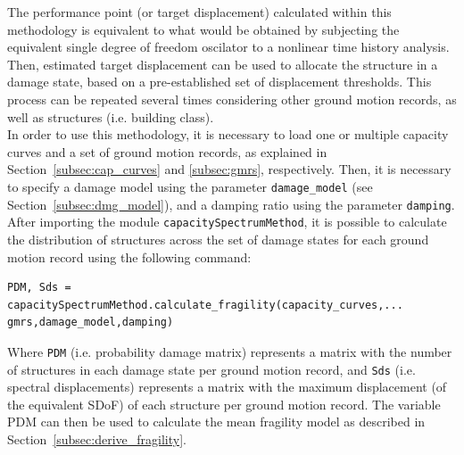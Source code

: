 The performance point (or target displacement) calculated within this methodology is equivalent to what would be obtained by subjecting the equivalent single degree of freedom oscilator to a nonlinear time history analysis. Then, estimated target displacement can be used to allocate the structure in a damage state, based on a pre-established set of displacement thresholds. This process can be repeated several times considering other ground motion records, as well as structures (i.e. building class).\\

In order to use this methodology, it is necessary to load one or multiple capacity curves and a set of ground motion records, as explained in Section~\ref{subsec:cap_curves} and \ref{subsec:gmrs}, respectively. Then, it is necessary to specify a damage model using the parameter \verb=damage_model= (see Section~\ref{subsec:dmg_model}), and a damping ratio using the parameter \verb=damping=. After importing the module \verb=capacitySpectrumMethod=, it is possible to calculate the distribution of structures across the set of damage states for each ground motion record using the following command:

\begin{Verbatim}[frame=single, commandchars=\\\{\}, samepage=true]
PDM, Sds = capacitySpectrumMethod.calculate_fragility(capacity_curves,...
gmrs,damage_model,damping)
\end{Verbatim}

Where \verb=PDM= (i.e. probability damage matrix) represents a matrix with the number of structures in each damage state per ground motion record, and \verb=Sds= (i.e. spectral displacements) represents a matrix with the maximum displacement (of the equivalent SDoF) of each structure per ground motion record. The variable PDM can then be used to calculate the mean fragility model as described in Section~\ref{subsec:derive_fragility}.



